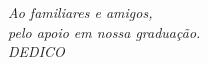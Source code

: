 \thispagestyle{empty}
\vspace*{18cm}

\begin{flushright}
  {\textit{Ao familiares e amigos,          \\ 
  pelo apoio em nossa graduação. \\
  \vspace{0.2 cm}
  DEDICO
  }}
\end{flushright} \normalsize